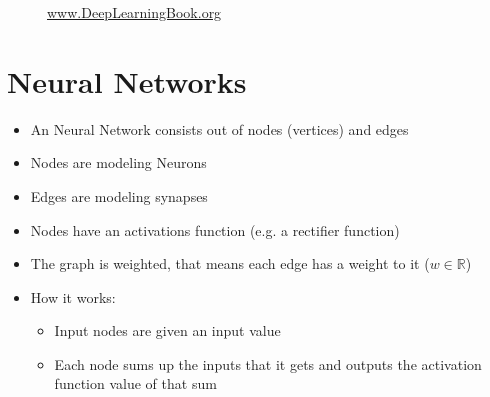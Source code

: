 \documentclass[handout]{beamer}
\begin{document}
\begin{frame}
\begin{itemize}
\begin{figure}
\begin{minipage}{0.45\textwidth}
\begin{figure}[]
                \end{figure}
            \end{minipage}
            \caption{\href{http://www.deeplearningbook.org}{www.DeepLearningBook.org}}
        \end{figure}
    \end{itemize}
\end{frame}

\section{Neural Networks}

\begin{frame}
    \begin{itemize}[<+->]
        \item An Neural Network consists out of nodes (vertices) and edges
        \item Nodes are modeling Neurons
        \item Edges are modeling synapses
        \item Nodes have an activations function (e.g. a rectifier function)
        \item The graph is weighted, that means each edge has a weight to it (\(w \in \mathbb{R}\))
    \end{itemize}

    \begin{itemize}[<+->]
        \item How it works:
        \begin{itemize}[<+->]
            \item Input nodes are given an input value
            \item Each node sums up the inputs that it gets and outputs the activation function value of that sum
        \end{itemize}
    \end{itemize}
\end{frame}
\end{document}
